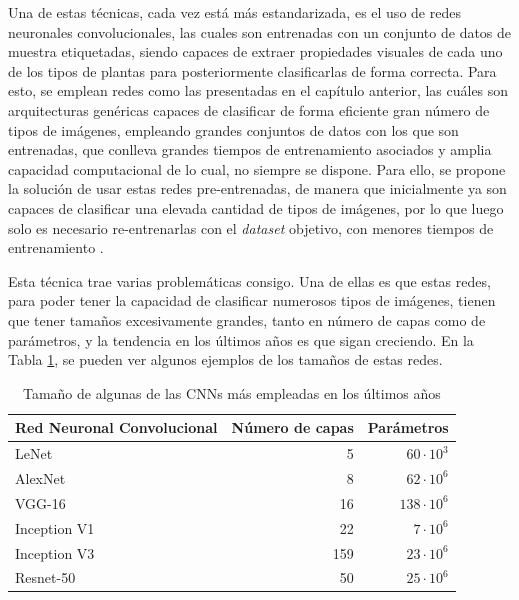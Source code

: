 Una de estas técnicas, cada vez está más estandarizada, es el uso de redes neuronales convolucionales, las cuales son entrenadas con un conjunto de datos de muestra etiquetadas, siendo capaces de extraer propiedades visuales de cada uno de los tipos de plantas para posteriormente clasificarlas de forma correcta. Para esto, se emplean redes como las presentadas en el capítulo anterior, las cuáles son arquitecturas genéricas capaces de clasificar de forma eficiente gran número de tipos de imágenes, empleando grandes conjuntos de datos con los que son entrenadas,  que conlleva grandes tiempos de entrenamiento asociados y amplia capacidad computacional de lo cual, no siempre se dispone. Para ello, se propone la solución de usar estas redes pre-entrenadas, de manera que inicialmente ya son capaces de clasificar una elevada cantidad de tipos de imágenes, por lo que luego solo es necesario re-entrenarlas con el \textit{dataset} objetivo, con menores tiempos de entrenamiento \cite{Olsen2019}.

Esta técnica trae varias problemáticas consigo. Una de ellas es que estas redes, para poder tener la capacidad de clasificar numerosos tipos de imágenes, tienen que tener tamaños excesivamente grandes, tanto en número de capas como de parámetros, y la tendencia en los últimos años es que sigan creciendo. En la Tabla \ref{tab:tamaño_cnn}, se pueden ver algunos ejemplos de los tamaños de estas redes.

\begin{table}[h]
\caption{Tamaño de algunas de las CNNs más empleadas en los últimos años}
\label{tab:tamaño_cnn}
\centering
\begin{tabular}{l|r|r}
\toprule
\multicolumn{1}{c|}{\textbf{Red Neuronal Convolucional}} & \multicolumn{1}{c|}{\textbf{Número de capas}} & \multicolumn{1}{c}{\textbf{Parámetros}} \\ \hline
LeNet \cite{lesnet}                                                    & 5                                             & $60 \cdot 10^3$                                   \\
AlexNet \cite{NIPS2012_c399862d}                                                 & 8                                             & $62 \cdot 10^6$                                \\
VGG-16 \cite{simonyan2015deep}                                                   & 16                                            & $138 \cdot 10^6$                               \\
Inception V1 \cite{szegedy2014going}                                            & 22                                            &  $7 \cdot 10^6$                                 \\
Inception V3 \cite{szegedy2015rethinking}                                             & 159                                           & $23 \cdot 10^6$                                \\
Resnet-50 \cite{He2016}                                               & 50                                            & $25 \cdot 10^6$         \\
\bottomrule
\end{tabular}
\end{table}

